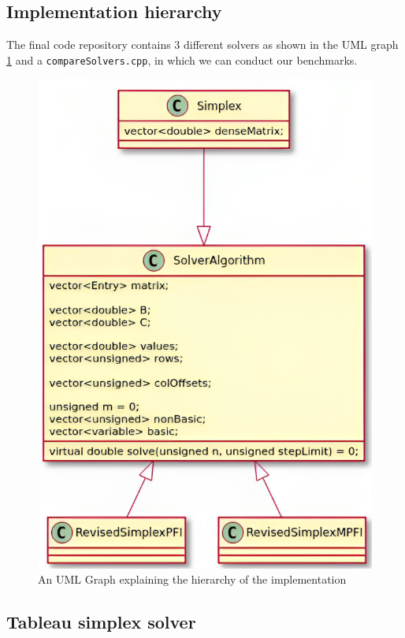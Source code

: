 \subsection{Implementation hierarchy}
The final code repository contains 3 different solvers as shown in the
UML graph \ref{fig:hierarchy}
and a \verb|compareSolvers.cpp|, in which we can conduct our benchmarks.
\begin{figure}[htpb]
    \centering
    \includegraphics[height=0.6\textheight]{figures/UML.png}
    \caption{An UML Graph explaining the hierarchy of the implementation} \label{fig:tumslide}
    \label{fig:hierarchy}
\end{figure}
\subsection{Tableau simplex solver}
